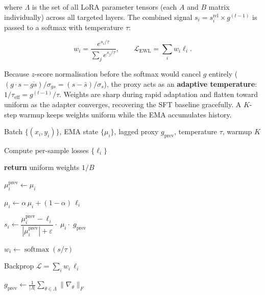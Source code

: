 where $\Lambda$ is the set of all LoRA parameter tensors (each $A$ and $B$
matrix individually) across all targeted layers.
The combined signal $s_i = s_i^{\text{rel}} \times g^{(t-1)}$ is passed to a
softmax with temperature $\tau$:

{\small
\begin{equation}
  w_i = \frac{e^{s_i / \tau}}{\sum_j e^{s_j / \tau}}, \qquad
  \mathcal{L}_{\text{EWL}} = \sum_i w_i \ell_i.
  \label{eq:weights}
\end{equation}
}

Because $z$-score normalisation before the softmax would cancel $g$ entirely
($(g{\cdot}s - \overline{gs})/\sigma_{gs} = (s - \bar s)/\sigma_s$), the proxy
acts as an \textbf{adaptive temperature}: $1/\tau_{\text{eff}} = g^{(t-1)}/\tau$.
Weights are sharp during rapid adaptation and flatten toward uniform as the
adapter converges, recovering the SFT baseline gracefully.
A $K$-step warmup keeps weights uniform while the EMA accumulates history.

\begin{algorithm}[htbp]
\caption{EWL Training Step}
\label{alg:ewl}
\footnotesize
\begin{algorithmic}[1]
\Require Batch $\{(x_i, y_i)\}$, EMA state $\{\mu_i\}$,
         lagged proxy $g_{\text{prev}}$, temperature $\tau$, warmup $K$

\State Compute per-sample losses $\{\ell_i\}$

    \textbf{return} uniform weights $1/B$
\EndIf

\State $\mu_i^{\text{prev}} \gets \mu_i$

\State $\mu_i \gets \alpha\,\mu_i + (1{-}\alpha)\,\ell_i$

\State $s_i \gets \dfrac{\mu_i^{\text{prev}} - \ell_i}{|\mu_i^{\text{prev}}|+\varepsilon}
       \cdot\;\mu_i \cdot\;g_{\text{prev}}$

\State $w_i \gets \operatorname{softmax}(s/\tau)$

\State Backprop $\mathcal{L} = \sum_i w_i\,\ell_i$

\State $g_{\text{prev}} \gets \tfrac{1}{|\Lambda|}
       \sum_{\theta \in \Lambda}\|\nabla_\theta\|_F$

\end{algorithmic}
\end{algorithm}

